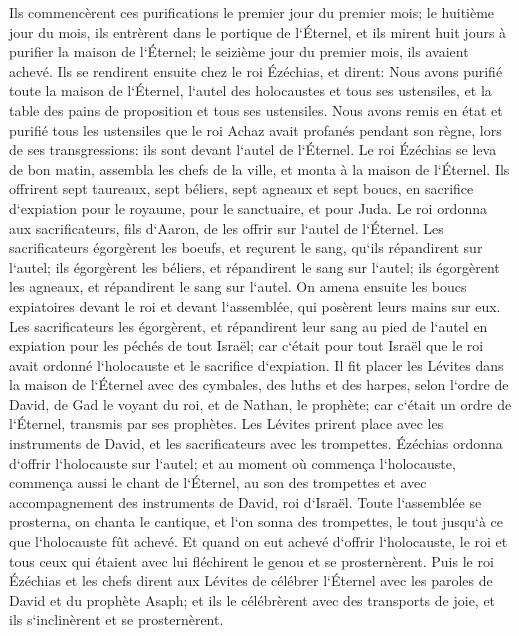 \verse Ils commencèrent ces purifications le premier jour du premier mois; le huitième jour du mois, ils entrèrent dans le portique de l`Éternel, et ils mirent huit jours à purifier la maison de l`Éternel; le seizième jour du premier mois, ils avaient achevé. 
\verse Ils se rendirent ensuite chez le roi Ézéchias, et dirent: Nous avons purifié toute la maison de l`Éternel, l`autel des holocaustes et tous ses ustensiles, et la table des pains de proposition et tous ses ustensiles. 
\verse Nous avons remis en état et purifié tous les ustensiles que le roi Achaz avait profanés pendant son règne, lors de ses transgressions: ils sont devant l`autel de l`Éternel. 
\verse Le roi Ézéchias se leva de bon matin, assembla les chefs de la ville, et monta à la maison de l`Éternel. 
\verse Ils offrirent sept taureaux, sept béliers, sept agneaux et sept boucs, en sacrifice d`expiation pour le royaume, pour le sanctuaire, et pour Juda. Le roi ordonna aux sacrificateurs, fils d`Aaron, de les offrir sur l`autel de l`Éternel. 
\verse Les sacrificateurs égorgèrent les boeufs, et reçurent le sang, qu`ils répandirent sur l`autel; ils égorgèrent les béliers, et répandirent le sang sur l`autel; ils égorgèrent les agneaux, et répandirent le sang sur l`autel. 
\verse On amena ensuite les boucs expiatoires devant le roi et devant l`assemblée, qui posèrent leurs mains sur eux. 
\verse Les sacrificateurs les égorgèrent, et répandirent leur sang au pied de l`autel en expiation pour les péchés de tout Israël; car c`était pour tout Israël que le roi avait ordonné l`holocauste et le sacrifice d`expiation. 
\verse Il fit placer les Lévites dans la maison de l`Éternel avec des cymbales, des luths et des harpes, selon l`ordre de David, de Gad le voyant du roi, et de Nathan, le prophète; car c`était un ordre de l`Éternel, transmis par ses prophètes. 
\verse Les Lévites prirent place avec les instruments de David, et les sacrificateurs avec les trompettes. 
\verse Ézéchias ordonna d`offrir l`holocauste sur l`autel; et au moment où commença l`holocauste, commença aussi le chant de l`Éternel, au son des trompettes et avec accompagnement des instruments de David, roi d`Israël. 
\verse Toute l`assemblée se prosterna, on chanta le cantique, et l`on sonna des trompettes, le tout jusqu`à ce que l`holocauste fût achevé. 
\verse Et quand on eut achevé d`offrir l`holocauste, le roi et tous ceux qui étaient avec lui fléchirent le genou et se prosternèrent. 
\verse Puis le roi Ézéchias et les chefs dirent aux Lévites de célébrer l`Éternel avec les paroles de David et du prophète Asaph; et ils le célébrèrent avec des transports de joie, et ils s`inclinèrent et se prosternèrent. 
